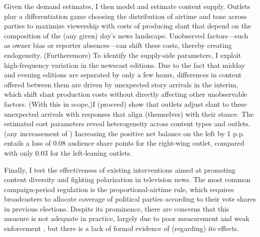 \documentclass[12pt]{article}
\begin{document}
	Given the demand estimates, I then model and estimate content supply. Outlets play a differentiation game choosing the distribution of airtime and tone across parties to maximize viewership with costs of producing slant that depend on the composition of the (any given) day's news landscape. Unobserved factors—such as owner bias or reporter absences—can shift these costs, thereby creating endogeneity. (Furtheremore) To identify the supply-side parameters, I exploit high-frequency variation in the newscast editions. Due to the fact that midday and evening editions are separated by only a few hours, differences in content offered between them are driven by unexpected story arrivals in the interim, which shift slant production costs without directly affecting other unobservable factors. (With this in scope,)I (proceed) show that outlets adjust slant to these unexpected arrivals with responses that align (themselves) with their stance. The estimated cost parameters reveal heterogeneity  across content types and  outlets. (any increasement of ) Increasing the positive net balance on the left by 1 p.p. entails a loss of 0.08 audience share points for the right-wing outlet, compared with only 0.03 for the left-leaning outlets. 
	
	
	Finally, I test the effectiveness of existing  interventions aimed at promoting content diversity and fighting polarization in television news. The most common campaign-period regulation  is the proportional-airtime rule, which requires broadcasters to allocate coverage of political parties according to their vote shares in previous elections. Despite its prominence, there are concerns that this measure is not adequate in practice, largely due to poor measurement and weak enforcement \citep{cage_assemblee}, but there is a lack of formal evidence of (regarding) its effects. 
	
	
	
\end{document}
